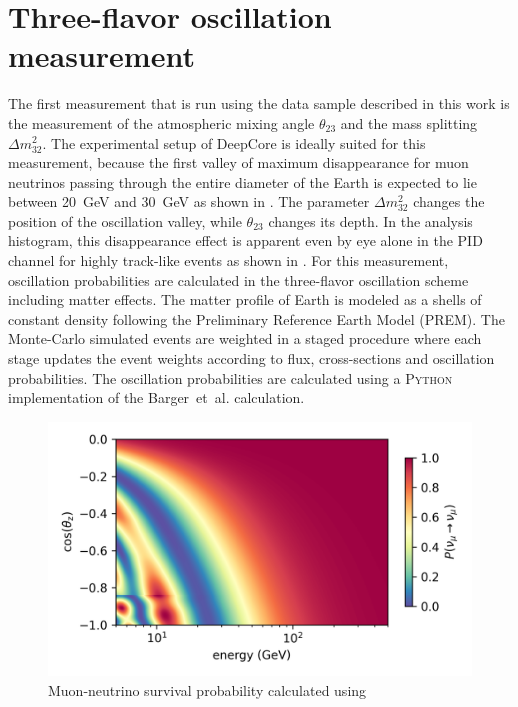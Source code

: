 \chapter{Three-flavor oscillation measurement}
\setchapterpreamble[u]{\margintoc}

The first measurement that is run using the data sample described in this work is the measurement of the atmospheric mixing angle $\theta_{23}$ and the mass splitting $\Delta m^2_{32}$. The experimental setup of DeepCore is ideally suited for this measurement, because the first valley of maximum disappearance for muon neutrinos passing through the entire diameter of the Earth is expected to lie between 20~GeV and 30~GeV as shown in . The parameter $\Delta m^2_{32}$ changes the position of the oscillation valley, while $\theta_{23}$ changes its depth. In the analysis histogram, this disappearance effect is apparent even by eye alone in the PID channel for highly track-like events as shown in . For this measurement, oscillation probabilities are calculated in the three-flavor oscillation scheme including matter effects. The matter profile of Earth is modeled as a shells of constant density following the Preliminary Reference Earth Model (PREM). The Monte-Carlo simulated events are weighted in a staged procedure where each stage updates the event weights according to flux, cross-sections and oscillation probabilities. The oscillation probabilities are calculated using a \textsc{Python} implementation of the Barger~et~al. calculation.

\begin{figure}
    \centering
    \includegraphics[width=0.9\linewidth]{figures/measurement/three_flavor/numu_surv_prob_no_sterile_no_text.png}
    \caption{Muon-neutrino survival  probability calculated using}
    \label{fig:three-flavor-oscprob}
\end{figure}

